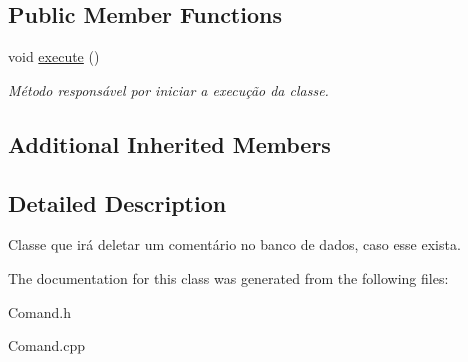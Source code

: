 \subsection*{Public Member Functions}
\begin{DoxyCompactItemize}
\item 
\hypertarget{class_command_delete_coment_ae614055e5d5b28ef6921edbab3b99a7c}{void \hyperlink{class_command_delete_coment_ae614055e5d5b28ef6921edbab3b99a7c}{execute} ()}\label{class_command_delete_coment_ae614055e5d5b28ef6921edbab3b99a7c}

\begin{DoxyCompactList}\small\item\em Método responsável por iniciar a execução da classe. \end{DoxyCompactList}\end{DoxyCompactItemize}
\subsection*{Additional Inherited Members}


\subsection{Detailed Description}
Classe que irá deletar um comentário no banco de dados, caso esse exista. 

The documentation for this class was generated from the following files\-:\begin{DoxyCompactItemize}
\item 
Comand.\-h\item 
Comand.\-cpp\end{DoxyCompactItemize}
